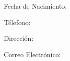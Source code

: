\setlength{\parskip}{0pt} %
Fecha de Nacimiento: \nacimiento

Télefono: \telefono

Dirección: \direccion

Correo Electrónico: \correo
\vspace{0.8cm}
